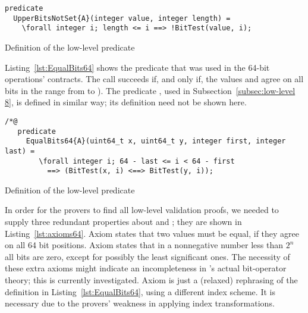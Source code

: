 \begin{listing}[hbt]
\begin{minipage}{0.99\textwidth}
\begin{lstlisting}[style=acsl-block]
predicate
  UpperBitsNotSet{A}(integer value, integer length) =
    \forall integer i; length <= i ==> !BitTest(value, i);
\end{lstlisting}
\end{minipage}
\caption{\label{lst:UpperBitsNotSet integer}
	Definition of the low-level predicate }
\end{listing}


Listing~\ref{lst:EqualBits64} shows the predicate
 that was used in the 64-bit
operations' contracts.
%
The call  succeeds if, and only
if, the  values   and  
agree on all bits in the range from  to ).
%
The predicate , used in
Subsection~\ref{subsec:low-level 8}, is defined in similar way; its
definition need not be shown here.










\begin{listing}[hbt]
\begin{minipage}{0.99\textwidth}
\begin{lstlisting}[style=acsl-block]
/*@
   predicate
     EqualBits64{A}(uint64_t x, uint64_t y, integer first, integer last) =
        \forall integer i; 64 - last <= i < 64 - first 
          ==> (BitTest(x, i) <==> BitTest(y, i));
\end{lstlisting}
\end{minipage}
\caption{\label{lst:EqualBits64}
        Definition of the low-level predicate }
\end{listing}








In order for the provers to find all low-level validation proofs, we
needed to supply three redundant properties about
 and ; they are shown
in Listing~\ref{lst:axioms64}.
%
Axiom  states that two 
values must be equal, if they agree on all 64 bit positions.
%
Axiom  states that in a nonnegative number
less than $2^n$ all bits are zero, except for possibly
the least significant  ones.
%
The necessity of these extra axioms might indicate an
incompleteness in \framac's actual bit-operator theory; this is currently
investigated.
%
Axiom  is just a (relaxed)
rephrasing of the definition
in Listing~\ref{lst:EqualBits64}, using a different index scheme.
%
It is necessary due to the provers' weakness in applying index
transformations.










